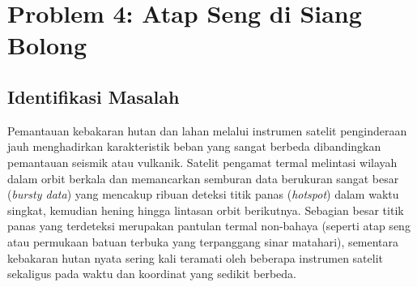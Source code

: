 \clearpage
\section{Problem 4: Atap Seng di Siang Bolong}
\label{sec:problem_4}

\subsection{Identifikasi Masalah}
Pemantauan kebakaran hutan dan lahan melalui instrumen satelit penginderaan jauh menghadirkan karakteristik beban yang sangat berbeda dibandingkan pemantauan seismik atau vulkanik. Satelit pengamat termal melintasi wilayah dalam orbit berkala dan memancarkan semburan data berukuran sangat besar (\textit{bursty data}) yang mencakup ribuan deteksi titik panas (\textit{hotspot}) dalam waktu singkat, kemudian hening hingga lintasan orbit berikutnya. Sebagian besar titik panas yang terdeteksi merupakan pantulan termal non-bahaya (seperti atap seng atau permukaan batuan terbuka yang terpanggang sinar matahari), sementara kebakaran hutan nyata sering kali teramati oleh beberapa instrumen satelit sekaligus pada waktu dan koordinat yang sedikit berbeda.

\vspace{1em}

